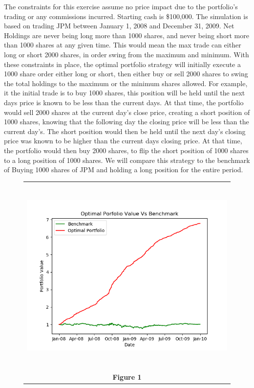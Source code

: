 \documentclass[
	letterpaper, %
]{jdf}
\begin{document}
The constraints for this exercise assume no price impact due to the portfolio's trading or any  commissions incurred.  Starting cash is \$100,000. The simulation is based on trading JPM between January 1, 2008 and December 31, 2009.  Net Holdings are never being long more than 1000 shares, and never being short more than 1000 shares at any given time. This would mean the max trade can either long or short 2000 shares, in order swing from the maximum and minimum.  With these constraints in place, the optimal portfolio strategy will initially execute a 1000 share order either long or short, then either buy or sell 2000 shares to swing the total holdings to the maximum or the minimum shares allowed. For example, it the initial trade is to buy 1000 shares, this position will be held until the next days price is known to be less than the current days.  At that time, the portfolio would sell 2000 shares at the current day's close price, creating a short position of 1000 shares, knowing that the following day the closing price will be less than the current day's.  The short position would then be held until the next day's closing price was known to be higher than the current days closing price.  At that time, the portfolio would then buy 2000 shares, to flip the short position of 1000 shares to a long position of 1000 shares. We will compare this strategy to the benchmark of Buying 1000 shares of JPM and holding a long position for the entire period.

\begin{figure}[h]
	\begin{tabular}{c}
		\includegraphics[height=10cm]{optimal_portfolio.png} \\
		\textbf{Figure 1} \\
	\end{tabular}
\end{figure}
\end{document}
